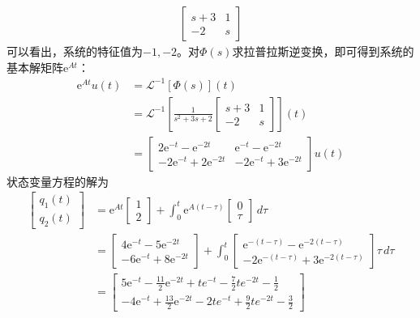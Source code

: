 \begin{example}
\begin{align*}
\begin{bmatrix}
            s+3 & 1\\
            -2 & s
        \end{bmatrix}
    \end{align*}
    可以看出，系统的特征值为$-1,-2$。对$\Phi(s)$求拉普拉斯逆变换，即可得到系统的基本解矩阵$\mathrm{e}^{At}$：\begin{align*}
        \mathrm{e}^{At}u(t)&=\mathcal{L} ^{-1} \left[\Phi(s)\right](t)\\
        &=\mathcal{L} ^{-1} \left[\frac{1}{s^2+3s+2}\begin{bmatrix}
            s+3 & 1\\
            -2 & s
        \end{bmatrix}\right](t)\\
        &=\begin{bmatrix}
            2\mathrm{e}^{-t}-\mathrm{e}^{-2t} & \mathrm{e}^{-t}-\mathrm{e}^{-2t}\\
            -2\mathrm{e}^{-t}+2\mathrm{e}^{-2t} & -2\mathrm{e}^{-t}+3\mathrm{e}^{-2t}
        \end{bmatrix}u(t)
    \end{align*}
    状态变量方程的解为\begin{align*}
        \begin{bmatrix}
            q_1(t)\\
            q_2(t)
        \end{bmatrix}&=\mathrm{e}^{At}\begin{bmatrix}
            1\\
            2
        \end{bmatrix}+\int_0^{t}\mathrm{e}^{A(t-\tau)}\begin{bmatrix}
            0\\
            \tau
        \end{bmatrix}\,d\tau\\
        &=\begin{bmatrix}
            4\mathrm{e}^{-t}-5\mathrm{e}^{-2t}\\
            -6\mathrm{e}^{-t}+8\mathrm{e}^{-2t}
        \end{bmatrix}+\int_0^{t}\begin{bmatrix}
            \mathrm{e}^{-(t-\tau)}-\mathrm{e}^{-2(t-\tau)}\\
            -2\mathrm{e}^{-(t-\tau)}+3\mathrm{e}^{-2(t-\tau)}
        \end{bmatrix}\tau\,d\tau\\
        &=\begin{bmatrix}
            5\mathrm{e}^{-t}-\frac{11}{2}\mathrm{e}^{-2t}+te^{-t}-\frac{7}{2}te^{-2t}-\frac{1}{2}\\
            -4\mathrm{e}^{-t}+\frac{13}{2}\mathrm{e}^{-2t}-2te^{-t}+\frac{9}{2}te^{-2t}-\frac{3}{2}
        \end{bmatrix}
    \end{align*}
\end{example}

